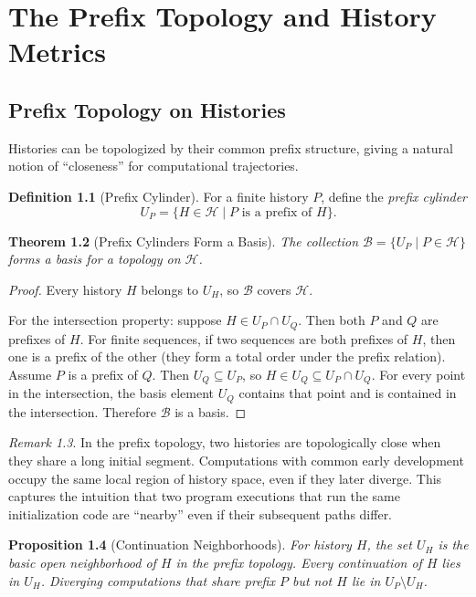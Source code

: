 \documentclass[12pt, a4paper, openany]{book}
\theoremstyle{plain}
\newtheorem{theorem}{Theorem}[chapter]
\newtheorem{proposition}[theorem]{Proposition}
\theoremstyle{definition}
\newtheorem{definition}[theorem]{Definition}
\theoremstyle{remark}
\newtheorem{remark}[theorem]{Remark}
\newcommand{\calH}{\mathcal{H}}
\begin{document}
\chapter{The Prefix Topology and History Metrics}

\section{Prefix Topology on Histories}

Histories can be topologized by their common prefix structure, giving a natural
notion of ``closeness'' for computational trajectories.

\begin{definition}[Prefix Cylinder]
For a finite history $P$, define the \emph{prefix cylinder}
\[
U_P = \{H \in \calH \mid P \text{ is a prefix of } H\}.
\]
\end{definition}

\begin{theorem}[Prefix Cylinders Form a Basis]
The collection $\mathcal{B} = \{U_P \mid P \in \calH\}$ forms a basis for a
topology on $\calH$.
\end{theorem}

\begin{proof}
Every history $H$ belongs to $U_H$, so $\mathcal{B}$ covers $\calH$.

For the intersection property: suppose $H \in U_P \cap U_Q$. Then both $P$ and
$Q$ are prefixes of $H$. For finite sequences, if two sequences are both prefixes
of $H$, then one is a prefix of the other (they form a total order under the
prefix relation). Assume $P$ is a prefix of $Q$. Then $U_Q \subseteq U_P$, so
$H \in U_Q \subseteq U_P \cap U_Q$. For every point in the intersection, the
basis element $U_Q$ contains that point and is contained in the intersection.
Therefore $\mathcal{B}$ is a basis.
\end{proof}

\begin{remark}
In the prefix topology, two histories are topologically close when they share
a long initial segment. Computations with common early development occupy the
same local region of history space, even if they later diverge. This captures
the intuition that two program executions that run the same initialization code
are ``nearby'' even if their subsequent paths differ.
\end{remark}

\begin{proposition}[Continuation Neighborhoods]
For history $H$, the set $U_H$ is the basic open neighborhood of $H$ in the
prefix topology. Every continuation of $H$ lies in $U_H$. Diverging computations
that share prefix $P$ but not $H$ lie in $U_P \setminus U_H$.
\end{proposition}
\end{document}
